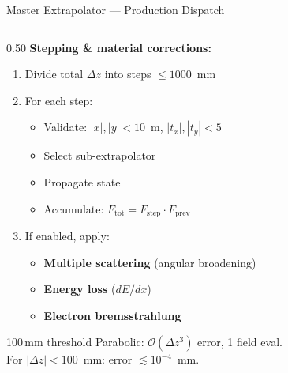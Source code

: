 \documentclass[aspectratio=169, 11pt]{beamer}
\newcommand{\dz}{\Delta z}
\newcommand{\tx}{t_x}
\newcommand{\ty}{t_y}
\begin{document}
\begin{frame}{Master Extrapolator --- Production Dispatch}
\begin{columns}[T]
\begin{column}{0.50\textwidth}
  \textbf{Stepping \& material corrections:}
  \begin{enumerate}\small
    \item Divide total $\dz$ into steps $\leq 1000$~mm
    \item For each step:
    \begin{itemize}\scriptsize
      \item Validate: $|x|,|y|<10$~m, $|\tx|,|\ty|<5$
      \item Select sub-extrapolator
      \item Propagate state
      \item Accumulate: $F_\text{tot} = F_\text{step}\cdot F_\text{prev}$
    \end{itemize}
    \item If enabled, apply:
    \begin{itemize}\scriptsize
      \item \textbf{Multiple scattering} (angular broadening)
      \item \textbf{Energy loss} ($dE/dx$)
      \item \textbf{Electron bremsstrahlung}
    \end{itemize}
  \end{enumerate}

  \vspace{6pt}
  \begin{block}{100\,mm threshold}
    Parabolic: $\mathcal{O}(\dz^3)$ error, 1 field eval.\\
    For $|\dz|<100$~mm: error $\lesssim 10^{-4}$~mm.
  \end{block}
\end{column}
\end{columns}
\end{frame}
\end{document}
